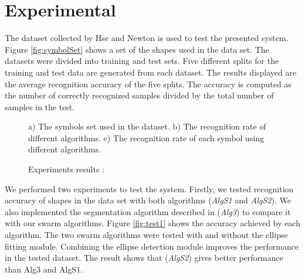 \documentclass{article}
\begin{document}
\section{Experimental}
\label{sec:Experiments}
 
The dataset collected by Hse and Newton\cite{HeloiseBeautification} is used to test the presented system.  Figure \ref{fig:symbolSet} shows a set of the shapes used in the data set. The datasets were divided into training and test sets. Five different splits for the training and test data are generated from each dataset. The results displayed are the average recognition accuracy of the five splits. The accuracy is computed as the number of correctly recognized samples divided by the total number of samples in the test.

 \begin{figure*}[]
	\centering
	\begin{minipage}[b]{5cm}	
\begin{center}
		
		\end{center}
		\end{minipage}
		\hfill
	\caption{Experiments results :} a) The symbols set used in the dataset.   b) The recognition rate of different algorithms.  c) The recognition rate of each symbol using different algorithms. 
\end{figure*} 
We performed two experiments to test the system. Firstly, we tested recognition accuracy of shapes in the data set with both algorithms (\textsl{AlgS1} and \textsl{AlgS2}). We also implemented the segmentation algorithm described in \cite{earlyprocess} (\textsl{Alg3}) to compare it with our swarm algorithms. Figure \ref{fig:test1} shows the accuracy achieved by each algorithm. The two swarm algorithms were tested with and without the ellipse fitting module. Combining the ellipse detection module improves the performance in the tested dataset. The result shows that (\textsl{AlgS2}) gives better performance than Alg3 and AlgS1. 
  
\end{document}
